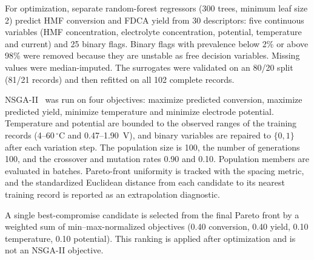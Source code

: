 \documentclass[10pt,a4paper]{article}
\newcommand{\degC}{\ensuremath{^{\circ}}C}
\begin{document}
For optimization, separate random-forest regressors (300 trees, minimum leaf
size 2) predict HMF conversion and FDCA yield from 30 descriptors: five
continuous variables (HMF concentration, electrolyte concentration, potential,
temperature and current) and 25 binary flags. Binary flags with prevalence below
2\% or above 98\% were removed because they are unstable as free decision
variables. Missing values were median-imputed. The surrogates were validated on
an 80/20 split (81/21 records) and then refitted on all 102 complete records.

NSGA-II~\cite{deb2002nsga2} was run on four objectives: maximize predicted
conversion, maximize predicted yield, minimize temperature and minimize electrode
potential. Temperature and potential are bounded to the observed ranges of the
training records (4--60\,\degC{} and 0.47--1.90~V), and binary variables are
repaired to $\{0,1\}$ after each variation step. The population size is 100,
the number of generations 100, and the crossover and mutation rates 0.90 and
0.10. Population members are evaluated in batches. Pareto-front uniformity is
tracked with the spacing metric, and the standardized Euclidean distance from
each candidate to its nearest training record is reported as an
extrapolation diagnostic.

A single best-compromise candidate is selected from the final Pareto front by a
weighted sum of min--max-normalized objectives (0.40 conversion, 0.40 yield,
0.10 temperature, 0.10 potential). This ranking is applied after optimization
and is not an NSGA-II objective.
\end{document}
